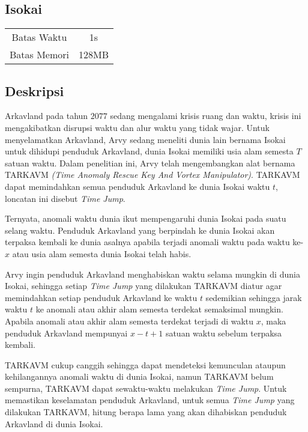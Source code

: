 \documentclass{article}
\begin{document}
\begin{center}
    \section*{Isokai} %

    \begin{tabular}{ | c c | }
        \hline
        Batas Waktu  & 1s \\    %
        Batas Memori & 128MB \\  %
        \hline
    \end{tabular}
\end{center}

\subsection*{Deskripsi}

Arkavland pada tahun $2077$ sedang mengalami krisis ruang dan waktu, krisis ini mengakibatkan disrupsi waktu dan alur waktu yang tidak wajar.
Untuk menyelamatkan Arkavland, Arvy sedang meneliti dunia lain bernama Isokai untuk dihidupi penduduk Arkavland, dunia Isokai memiliki usia alam semesta $T$ satuan waktu. 
Dalam penelitian ini, Arvy telah mengembangkan alat bernama TARKAVM \textit{(Time Anomaly Rescue Key And Vortex Manipulator)}. TARKAVM dapat memindahkan semua penduduk Arkavland ke dunia Isokai waktu $t$, loncatan ini disebut \textit{Time Jump}.

Ternyata, anomali waktu dunia ikut mempengaruhi dunia Isokai pada suatu selang waktu. Penduduk Arkavland yang berpindah ke dunia Isokai akan terpaksa kembali ke dunia asalnya apabila terjadi anomali waktu pada waktu ke-$x$ atau usia alam semesta dunia Isokai telah habis.

Arvy ingin penduduk Arkavland menghabiskan waktu selama mungkin di dunia Isokai, sehingga setiap \textit{Time Jump} yang dilakukan TARKAVM diatur agar memindahkan setiap penduduk Arkavland ke waktu $t$ sedemikian sehingga jarak waktu $t$ ke anomali atau akhir alam semesta terdekat semaksimal mungkin. Apabila anomali atau akhir alam semesta terdekat terjadi di waktu $x$, maka penduduk Arkavland mempunyai $x - t + 1$ satuan waktu sebelum terpaksa kembali.

TARKAVM cukup canggih sehingga dapat mendeteksi kemunculan ataupun kehilangannya anomali waktu di dunia Isokai, namun TARKAVM belum sempurna, TARKAVM dapat sewaktu-waktu melakukan \textit{Time Jump}. Untuk memastikan keselamatan penduduk Arkavland, untuk semua \textit{Time Jump} yang dilakukan TARKAVM, hitung berapa lama yang akan dihabiskan penduduk Arkavland di dunia Isokai.
\end{document}
